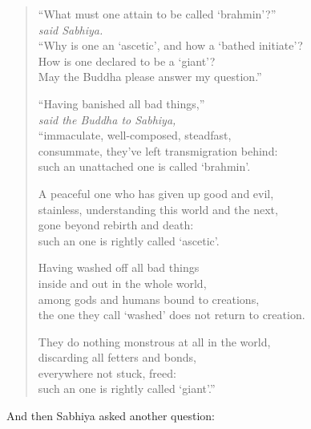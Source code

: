\documentclass[12pt,openany]{book}%
\newcommand*{\scspeaker}[1]{\hspace{2em}\textit{#1}}
\begin{document}
\begin{verse}%
“What must one attain to be called ‘brahmin’?” \\
\scspeaker{said Sabhiya. }\\
“Why is one an ‘ascetic’, and how a ‘bathed initiate’? \\
How is one declared to be a ‘giant’? \\
May the Buddha please answer my question.” 

“Having banished all bad things,” \\
\scspeaker{said the Buddha to Sabhiya, }\\
“immaculate, well-composed, steadfast, \\
consummate, they’ve left transmigration behind: \\
such an unattached one is called ‘brahmin’. 

A peaceful one who has given up good and evil, \\
stainless, understanding this world and the next, \\
gone beyond rebirth and death: \\
such an one is rightly called ‘ascetic’. 

Having washed off all bad things \\
inside and out in the whole world, \\
among gods and humans bound to creations, \\
the one they call ‘washed’ does not return to creation. 

They do nothing monstrous at all in the world, \\
discarding all fetters and bonds, \\
everywhere not stuck, freed: \\
such an one is rightly called ‘giant’.” 

%
\end{verse}

And then Sabhiya asked another question: 
\end{document}
